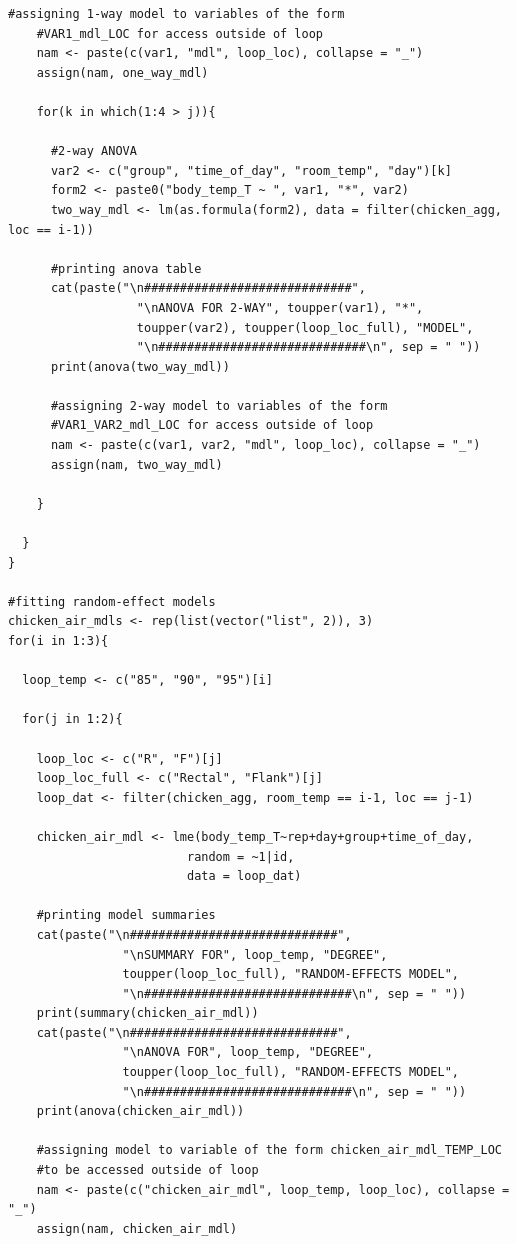 \documentclass[a4paper, 10pt, titlepage]{article}
\begin{document}
\begin{lstlisting}[basicstyle = \footnotesize \ttfamily]
    #assigning 1-way model to variables of the form 
    #VAR1_mdl_LOC for access outside of loop   
    nam <- paste(c(var1, "mdl", loop_loc), collapse = "_")
    assign(nam, one_way_mdl)
    
    for(k in which(1:4 > j)){
      
      #2-way ANOVA
      var2 <- c("group", "time_of_day", "room_temp", "day")[k]
      form2 <- paste0("body_temp_T ~ ", var1, "*", var2)
      two_way_mdl <- lm(as.formula(form2), data = filter(chicken_agg, loc == i-1))     

      #printing anova table
      cat(paste("\n#############################", 
                  "\nANOVA FOR 2-WAY", toupper(var1), "*", 
                  toupper(var2), toupper(loop_loc_full), "MODEL", 
                  "\n#############################\n", sep = " "))
      print(anova(two_way_mdl))   
      
      #assigning 2-way model to variables of the form 
      #VAR1_VAR2_mdl_LOC for access outside of loop
      nam <- paste(c(var1, var2, "mdl", loop_loc), collapse = "_")
      assign(nam, two_way_mdl)
      
    }
  
  } 
}

#fitting random-effect models
chicken_air_mdls <- rep(list(vector("list", 2)), 3)
for(i in 1:3){
  
  loop_temp <- c("85", "90", "95")[i]
  
  for(j in 1:2){
    
    loop_loc <- c("R", "F")[j]
    loop_loc_full <- c("Rectal", "Flank")[j]   
    loop_dat <- filter(chicken_agg, room_temp == i-1, loc == j-1)
    
    chicken_air_mdl <- lme(body_temp_T~rep+day+group+time_of_day,
                         random = ~1|id, 
                         data = loop_dat)   
    
    #printing model summaries
    cat(paste("\n#############################", 
                "\nSUMMARY FOR", loop_temp, "DEGREE", 
                toupper(loop_loc_full), "RANDOM-EFFECTS MODEL", 
                "\n#############################\n", sep = " "))
    print(summary(chicken_air_mdl))
    cat(paste("\n#############################", 
                "\nANOVA FOR", loop_temp, "DEGREE", 
                toupper(loop_loc_full), "RANDOM-EFFECTS MODEL", 
                "\n#############################\n", sep = " "))
    print(anova(chicken_air_mdl))
    
    #assigning model to variable of the form chicken_air_mdl_TEMP_LOC
    #to be accessed outside of loop
    nam <- paste(c("chicken_air_mdl", loop_temp, loop_loc), collapse = "_")
    assign(nam, chicken_air_mdl)
    

\end{lstlisting}
\end{document}
